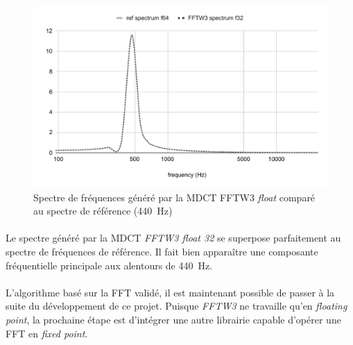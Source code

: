 \documentclass{article}
\begin{document}
    \begin{figure}[H]
        \centering
        \includegraphics[width=.8\linewidth]{./images/validation_fftw_f32.pdf}
        \caption{Spectre de fréquences généré par la MDCT FFTW3 \emph{float} comparé au spectre de référence (\SI{440}{\hertz})}
        \label{fig:validation_fftw3_f32}
    \end{figure}

    \paragraph{}
    Le spectre généré par la MDCT \emph{FFTW3 float 32} se superpose parfaitement au spectre de fréquences de référence. Il fait bien apparaître une composante fréquentielle principale aux alentours de \SI{440}{\hertz}.

    \paragraph{}
    L'algorithme basé sur la FFT validé, il est maintenant possible de passer à la suite du développement de ce projet. Puisque \emph{FFTW3} ne travaille qu'en \emph{floating point}, la prochaine étape est d'intégrer une autre librairie capable d'opérer une FFT en \emph{fixed point}.

\end{document}
